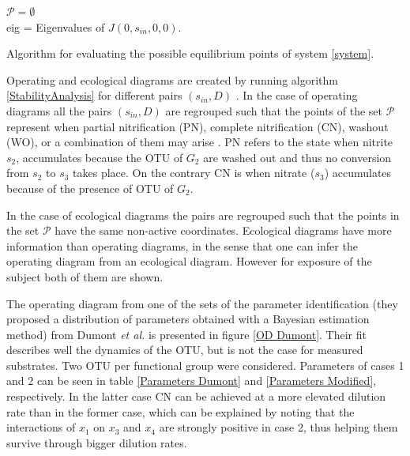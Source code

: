 \documentclass[3p,times]{elsarticle}
\newcommand{\N}{\mathbb{N}}
\newcommand{\R}{\mathbb{R}}
\begin{document}
\begin{algorithm}[H]
	\KwData{$A \in M_{n\times n}(\R)$, $D, s_{in}, \bar{\mu}_i,K_i, k_i,  \in \R \, i\in [n], $, $n_1, n_2 \in \N$}
	$\mathcal{P} = \emptyset$ \\
	eig = Eigenvalues of $J(0,s_{in},0,0)$. \\
	\label{StabilityAnalysis}
	\caption{Algorithm for evaluating the possible equilibrium points of system \eqref{system}.}
\end{algorithm}


Operating and ecological diagrams are created by running algorithm \ref{StabilityAnalysis} for different pairs $(s_{in},D)$ \cite{lobry2017chemostat}. In the case of operating diagrams all the pairs $(s_{in},D)$ are regrouped such that the points of the set $\mathcal{P}$ represent when partial nitrification (PN), complete nitrification (CN), washout (WO), or a combination of them may arise \cite{KHIN2004519}. PN refers to the state when nitrite $s_2$, accumulates because the OTU of $G_2$ are washed out and thus no conversion from $s_2$  to $s_3$ takes place. On the contrary CN is when nitrate ($s_3$) accumulates because of the presence of OTU of $G_2$. 

In the case of ecological diagrams the pairs are regrouped such that the points in the set $\mathcal{P}$ have the same non-active coordinates. Ecological diagrams have more information than operating diagrams, in the sense that one can infer the operating diagram from an ecological diagram. However for exposure of the subject both of them are shown.

The operating diagram from one of the sets of the parameter identification (they proposed a distribution of parameters obtained with a Bayesian estimation method) from Dumont \textit{et al.} \cite{Dumont2016} is presented in figure \ref{OD Dumont}. Their fit describes well the dynamics of the OTU, but is not the case for measured substrates. Two OTU per functional group were considered. Parameters of cases 1 and 2 can be seen in table \ref{Parameters Dumont} and \ref{Parameters Modified}, respectively. In the latter case CN can be achieved at a more elevated dilution rate than in the former case, which can be explained by noting that the interactions of $x_1$ on $x_3$ and $x_4$ are strongly positive in case 2, thus helping them survive through bigger dilution rates. 
\end{document}
